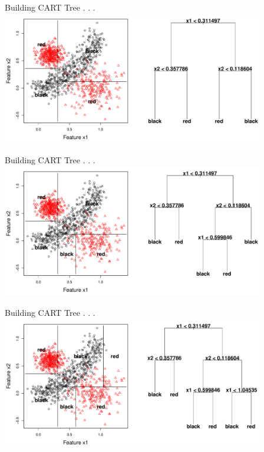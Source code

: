 \documentclass[12pt]{beamer}
\begin{document}

\begin{frame}{Building CART Tree . . .}
\includegraphics[height=2.3in,width=4.5in]{figs/tree_4.pdf}
\end{frame}

\begin{frame}{Building CART Tree . . .}
\includegraphics[height=2.3in,width=4.5in]{figs/tree_5.pdf}
\end{frame}

\begin{frame}{Building CART Tree . . .}
\includegraphics[height=2.3in,width=4.5in]{figs/tree_6.pdf}
\end{frame}
\end{document}
